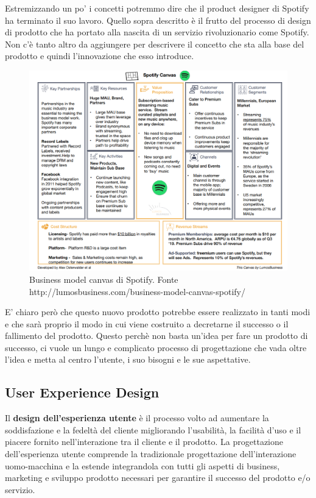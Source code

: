 Estremizzando un po' i concetti potremmo dire che il product designer di Spotify ha terminato il suo lavoro. Quello sopra descritto è il frutto del processo di design di prodotto che ha portato alla nascita di un servizio rivoluzionario come Spotify. Non c'è tanto altro da aggiungere per descrivere il concetto che sta alla base del prodotto e quindi l'innovazione che esso introduce.

\begin{figure}[!h]
	\centering
	\includegraphics[width=\textwidth]{immagini/spotifycanvas.png}
	\caption{Business model canvas di Spotify. Fonte http://lumosbusiness.com/business-model-canvas-spotify/}
\end{figure}

E' chiaro però che questo nuovo prodotto potrebbe essere realizzato in tanti modi e che sarà proprio il modo in cui viene costruito a decretarne il successo o il fallimento del prodotto. Questo perchè non basta un'idea per fare un prodotto di successo, ci vuole un lungo e complicato processo di progettazione che vada oltre l'idea e metta al centro l'utente, i suo bisogni e le sue aspettative.

\subsection{User Experience Design}
Il \textbf{design dell'esperienza utente} è il processo volto ad aumentare la soddisfazione e la fedeltà del cliente migliorando l'usabilità, la facilità d'uso e il piacere fornito nell'interazione tra il cliente e il prodotto. La progettazione dell'esperienza utente comprende la tradizionale progettazione dell'interazione uomo-macchina e la estende integrandola con tutti gli aspetti di business, marketing e sviluppo prodotto necessari per garantire il successo del prodotto e/o servizio.

